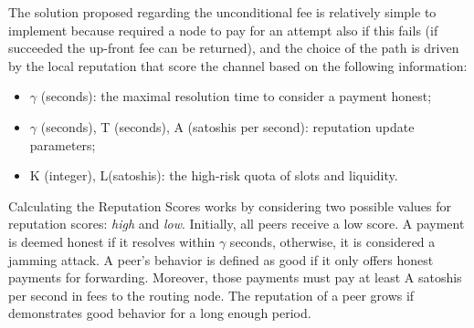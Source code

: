 The solution proposed regarding the unconditional fee is relatively simple to implement 
because required a node to pay for an attempt also if this fails (if succeeded the up-front fee can 
be returned), and the choice of the path is driven by the local reputation that 
score the channel based on the following information:

\begin{itemize}
    \item  $\gamma$ (seconds): the maximal resolution time to consider a payment honest;
    \item  $\gamma$  (seconds), T (seconds), A (satoshis per second): reputation update 
    parameters;
    \item  K (integer), L(satoshis): the high-risk quota of slots and liquidity.
\end{itemize}


Calculating the Reputation Scores works by considering two possible values
for reputation scores:  \emph{high}  and  \emph{low}. Initially, all peers 
receive a low score. A payment is deemed  honest  if it resolves within  
$\gamma$  seconds, otherwise, it is considered a jamming attack. 
A peer’s behavior is defined as  good  if it only offers honest payments 
for forwarding. Moreover, those payments must pay at least A satoshis 
per second in fees to the routing node. The reputation of a peer grows if 
demonstrates good behavior for a long enough period.
